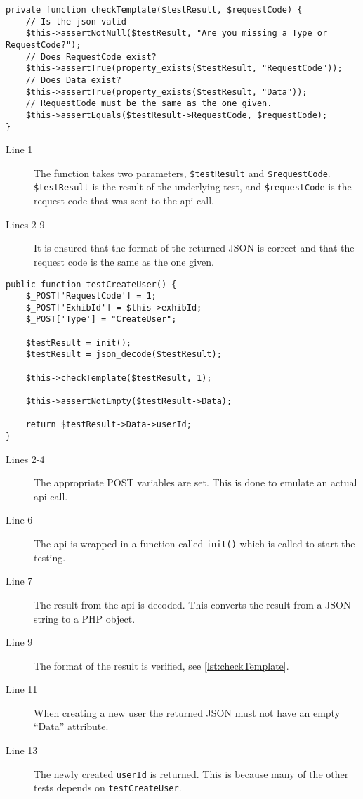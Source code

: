 \begin{lstlisting}[language=phpstyle, label=lst:checkTemplate, caption={checkTemplate unit test}]
private function checkTemplate($testResult, $requestCode) {
    // Is the json valid
    $this->assertNotNull($testResult, "Are you missing a Type or RequestCode?");
    // Does RequestCode exist?
    $this->assertTrue(property_exists($testResult, "RequestCode"));
    // Does Data exist?
    $this->assertTrue(property_exists($testResult, "Data"));    
    // RequestCode must be the same as the one given.
    $this->assertEquals($testResult->RequestCode, $requestCode);
}
\end{lstlisting}%
\begin{description}
\item[Line 1] The function takes two parameters, \lstinline|$testResult| and \lstinline|$requestCode|. \lstinline|$testResult| is the result of the underlying test, and \lstinline|$requestCode| is the request code that was sent to the \ac{api} call.
\item[Lines 2-9] It is ensured that the format of the returned JSON is correct and that the request code is the same as the one given. 
\end{description}

\begin{lstlisting}[language=phpstyle, label=lst:testCreateUser, caption={createUser unit test}]
public function testCreateUser() {
    $_POST['RequestCode'] = 1;
    $_POST['ExhibId'] = $this->exhibId;
    $_POST['Type'] = "CreateUser";

    $testResult = init();
    $testResult = json_decode($testResult);

    $this->checkTemplate($testResult, 1);

    $this->assertNotEmpty($testResult->Data);
    
    return $testResult->Data->userId;      
}
\end{lstlisting}%
\begin{description}
\item[Lines 2-4] The appropriate POST variables are set. This is done to emulate an actual \ac{api} call.
\item[Line 6] The \ac{api} is wrapped in a function called \lstinline|init()| which is called to start the testing.
\item[Line 7] The result from the \ac{api} is decoded. This converts the result from a JSON string to a PHP object.
\item[Line 9] The format of the result is verified, see \autoref{lst:checkTemplate}.
\item[Line 11] When creating a new user the returned JSON must not have an empty ``Data'' attribute.
\item[Line 13] The newly created \lstinline|userId| is returned. This is because many of the other tests depends on \lstinline|testCreateUser|.
\end{description}

